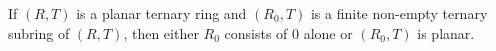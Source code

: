 If $(R, T)$ is a planar ternary ring and $(R_0, T)$ is a finite non-empty ternary subring of $(R, T)$, then either $R_0$ consists of $0$ alone or $(R_0, T)$ is planar.
